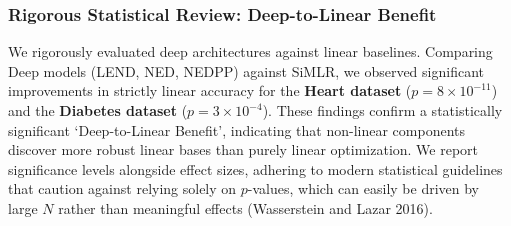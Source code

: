 \documentclass[
  letterpaper,
]{report}
\begin{document}
\subsubsection{Rigorous Statistical Review: Deep-to-Linear
Benefit}\label{rigorous-statistical-review-deep-to-linear-benefit}

We rigorously evaluated deep architectures against linear baselines.
Comparing Deep models (LEND, NED, NEDPP) against SiMLR, we observed
significant improvements in strictly linear accuracy for the
\textbf{Heart dataset} (\(p = 8 \times 10^{-11}\)) and the
\textbf{Diabetes dataset} (\(p = 3 \times 10^{-4}\)). These findings
confirm a statistically significant `Deep-to-Linear Benefit', indicating
that non-linear components discover more robust linear bases than purely
linear optimization. We report significance levels alongside effect
sizes, adhering to modern statistical guidelines that caution against
relying solely on \(p\)-values, which can easily be driven by large
\(N\) rather than meaningful effects (Wasserstein and Lazar 2016).
\end{document}
